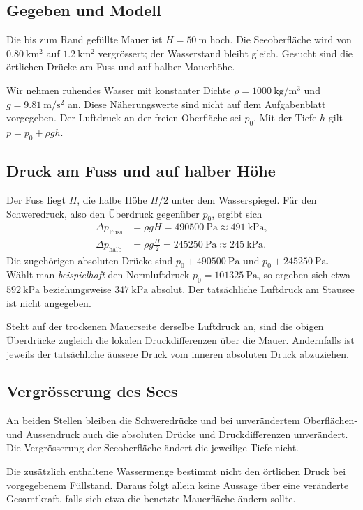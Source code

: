 
\subsection*{Gegeben und Modell}
Die bis zum Rand gefüllte Mauer ist \(H=\qty{50}{\metre}\) hoch. Die
Seeoberfläche wird von \(\qty{0.80}{\kilo\metre\squared}\) auf
\(\qty{1.2}{\kilo\metre\squared}\) vergrössert; der Wasserstand bleibt
gleich. Gesucht sind die örtlichen Drücke am Fuss und auf halber Mauerhöhe.

Wir nehmen ruhendes Wasser mit konstanter Dichte
\(\rho=\qty{1000}{\kilogram\per\metre\cubed}\) und
\(g=\qty{9.81}{\metre\per\second\squared}\) an. Diese Näherungswerte
sind nicht auf dem Aufgabenblatt vorgegeben. Der Luftdruck an der freien
Oberfläche sei \(p_0\). Mit der Tiefe \(h\) gilt \(p=p_0+\rho gh\).

\subsection*{Druck am Fuss und auf halber Höhe}
Der Fuss liegt \(H\), die halbe Höhe \(H/2\) unter dem Wasserspiegel. Für
den Schweredruck, also den Überdruck gegenüber \(p_0\), ergibt sich
\begin{align}
  \Delta p_{\mathrm{Fuss}}&=\rho gH
    =\qty{490500}{\pascal}\approx\qty{491}{\kilo\pascal},\\
  \Delta p_{\mathrm{halb}}&=\rho g\frac{H}{2}
    =\qty{245250}{\pascal}\approx\qty{245}{\kilo\pascal}.
\end{align}
Die zugehörigen absoluten Drücke sind \(p_0+\qty{490500}{\pascal}\) und
\(p_0+\qty{245250}{\pascal}\). Wählt man \emph{beispielhaft} den
Normluftdruck \(p_0=\qty{101325}{\pascal}\), so ergeben sich etwa
\(\qty{592}{\kilo\pascal}\) beziehungsweise \(\qty{347}{\kilo\pascal}\) absolut.
Der tatsächliche Luftdruck am Stausee ist nicht angegeben.

Steht auf der trockenen Mauerseite derselbe Luftdruck an, sind die obigen
Überdrücke zugleich die lokalen Druckdifferenzen über die Mauer. Andernfalls
ist jeweils der tatsächliche äussere Druck vom inneren absoluten Druck
abzuziehen.

\subsection*{Vergrösserung des Sees}
\begin{ergebnis}
An beiden Stellen bleiben die Schweredrücke und bei unverändertem
Oberflächen- und Aussendruck auch die absoluten Drücke und Druckdifferenzen
unverändert. Die Vergrösserung der Seeoberfläche ändert die jeweilige Tiefe
nicht.
\end{ergebnis}
Die zusätzlich enthaltene Wassermenge bestimmt nicht den örtlichen Druck bei
vorgegebenem Füllstand. Daraus folgt allein keine Aussage über eine veränderte
Gesamtkraft, falls sich etwa die benetzte Mauerfläche ändern sollte.

